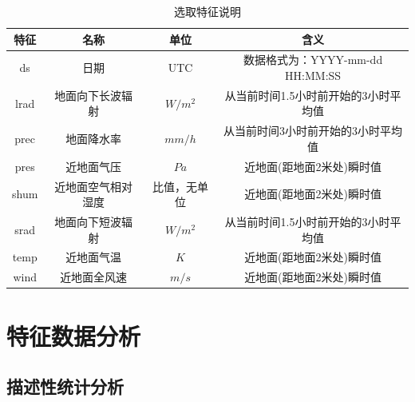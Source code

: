 \documentclass[AutoFakeBold]{LZUThesis}
\begin{document}
\begin{table}[H]
    \centering
    \caption{选取特征说明}
    \begin{tabular}{cccc}
    \toprule
    特征 & 名称 & 单位 & 含义 \\
    \midrule
    ds & 日期 & UTC & 数据格式为：YYYY-mm-dd HH:MM:SS \\
    lrad & 地面向下长波辐射 & $W/m^2$ & 从当前时间1.5小时前开始的3小时平均值 \\
    prec & 地面降水率 & $mm/h$ & 从当前时间3小时前开始的3小时平均值 \\
    pres & 近地面气压 & $Pa$ & 近地面(距地面2米处)瞬时值 \\
    shum & 近地面空气相对湿度 & 比值，无单位 & 近地面(距地面2米处)瞬时值 \\
    srad & 地面向下短波辐射 & $W/m^2$ & 从当前时间1.5小时前开始的3小时平均值 \\
    temp & 近地面气温 & $K$ & 近地面(距地面2米处)瞬时值 \\
    wind & 近地面全风速 & $m/s$ & 近地面(距地面2米处)瞬时值 \\
    \bottomrule
    \end{tabular}
    \label{features}
\end{table}

\section{特征数据分析}
\subsection{描述性统计分析}
\end{document}
